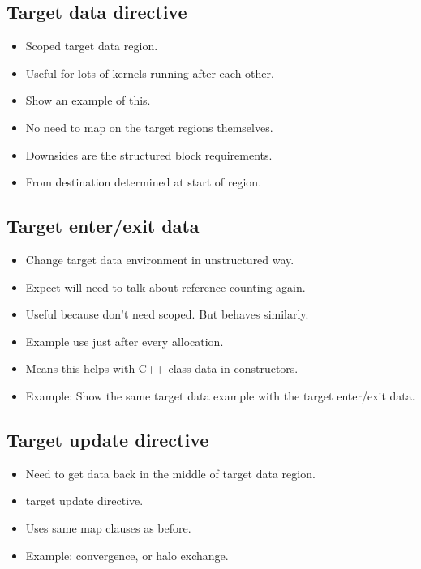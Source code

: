 \subsection{Target data directive}
\label{ssec:target_data}
\begin{itemize}
  \item Scoped target data region.
  \item Useful for lots of kernels running after each other.
  \item Show an example of this.
  \item No need to map on the target regions themselves.
  \item Downsides are the structured block requirements.
  \item From destination determined at start of region.
\end{itemize}

\subsection{Target enter/exit data}
\label{ssec:target_enter_exit_data}
\begin{itemize}
  \item Change target data environment in unstructured way.
  \item Expect will need to talk about reference counting again.
  \item Useful because don't need scoped. But behaves similarly.
  \item Example use just after every allocation.
  \item Means this helps with C++ class data in constructors.
  \item Example: Show the same target data example with the target enter/exit data.
\end{itemize}

\subsection{Target update directive}
\label{ssec:target_update}
\begin{itemize}
  \item Need to get data back in the middle of target data region.
  \item target update directive.
  \item Uses same map clauses as before.
  \item Example: convergence, or halo exchange.
\end{itemize}

